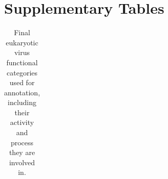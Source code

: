 \documentclass[
  sn-nature,
]{sn-jnl}
\begin{document}
\restoregeometry
\clearpage

\FloatBarrier

\newpage{}

\clearpage
{}

\section{Supplementary Tables}\label{supplementary-tables}

\begin{longtable}{lll}

\caption{\label{tbl-supp-functional-categories}Final eukaryotic virus
functional categories used for annotation, including their activity and
process they are involved in.}

\tabularnewline


\end{longtable}
\end{document}
